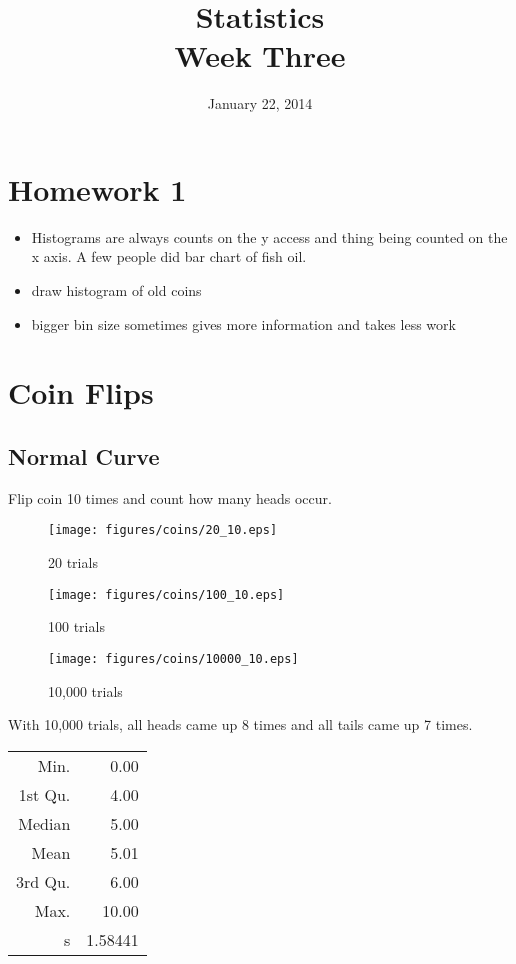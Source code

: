\documentclass{exam}
\author{}
\date{January 22, 2014}
\title{Statistics \\ Week Three}
\begin{document}
  \maketitle
  \tableofcontents
  \section{Homework 1}

  \begin{itemize}
    \item Histograms are always counts on the y access and thing being counted on the x
      axis.   A few people did bar chart of fish oil.

    \item draw histogram of old coins

    \item bigger bin size sometimes gives more information and takes less work
  \end{itemize}

  \section{Coin Flips}

  \subsection{Normal Curve}
  Flip coin 10 times and count how many heads occur.

  \begin{figure}[H]
    \centering
    \texttt{[image: figures/coins/20\_10.eps]}
    \caption{20 trials}
  \end{figure}

  \begin{figure}[H]
    \centering
    \texttt{[image: figures/coins/100\_10.eps]}
    \caption{100 trials}
  \end{figure}

  \begin{figure}[H]
    \centering
    \texttt{[image: figures/coins/10000\_10.eps]}
    \caption{10,000 trials}
  \end{figure}

  With 10,000 trials, all heads came up 8 times and all tails came up 7 times.

  \begin{table}[H]
    \centering
    \begin{tabular}{rr}
      \toprule
      Min.    & 0.00 \\
      1st Qu. & 4.00 \\
      Median  & 5.00 \\
      Mean    & 5.01 \\
      3rd Qu. & 6.00 \\
      Max.    & 10.00 \\
      s       & 1.58441 \\
      \bottomrule
    \end{tabular}
  \end{table}
\end{document}
